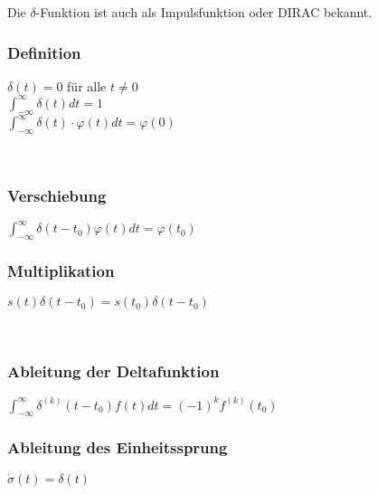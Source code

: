 Die $\delta$-Funktion ist auch als Impulsfunktion oder DIRAC bekannt.
\subsubsection[Definition]{Definition}
\begin{minipage}{0.3\textwidth}
		\begin{framed}
			\centering
			$\delta(t)=0$ für alle $t \neq 0$\\
			$\int_{-\infty}^{\infty} \delta(t) d t=1$\\
			$\int_{-\infty}^{\infty} \delta(t) \cdot \varphi(t) d t=\varphi(0)$
		\end{framed}
\end{minipage}\\[10pt]
%
\begin{minipage}{0.5\textwidth}
	\subsubsection{Verschiebung}
	$\int_{-\infty}^{\infty} \delta\left(t-t_{0}\right) \varphi(t) d t=\varphi\left(t_{0}\right)$
\end{minipage}
%
\begin{minipage}{0.5\textwidth}
	\subsubsection{Multiplikation}
	$s(t) \delta\left(t-t_{0}\right)=s\left(t_{0}\right) \delta\left(t-t_{0}\right)$
\end{minipage}\\[10pt]
%
\begin{minipage}{0.5\textwidth}
	\subsubsection{Ableitung der Deltafunktion}
	$\int_{-\infty}^{\infty} \delta^{(k)}\left(t-t_{0}\right) f(t) d t=(-1)^{k} f^{(k)}\left(t_{0}\right)$
\end{minipage}
\begin{minipage}{0.5\textwidth}
	\subsubsection{Ableitung des Einheitssprung}
	$\dot{\sigma}(t)=\delta(t)$
\end{minipage}
